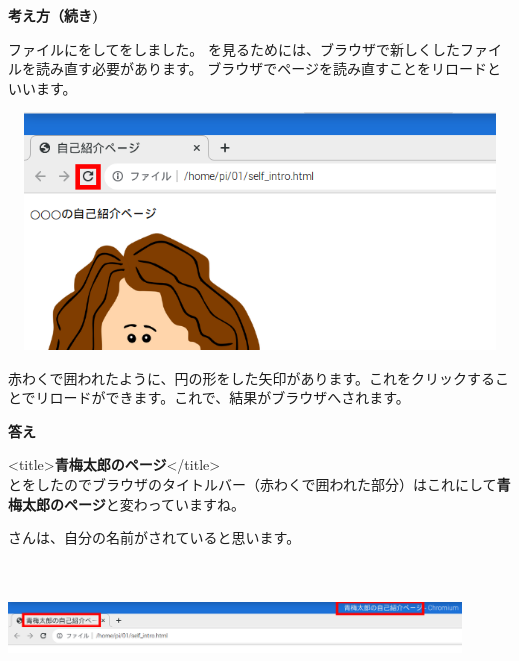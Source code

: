 \documentclass[a4paper,12pt]{jarticle}
\begin{document}
\clearpage
\flushleft
\textbf{考え方（続き)}




ファイルにをしてをしました。
を見るためには、ブラウザで新しくしたファイルを読み直す必要があります。
ブラウザでページを読み直すことをリロードといいます。


\bigskip


\bigskip
\centering
\includegraphics[width=13.665cm,height=6.287cm]{textbook-img149.png}

\flushleft
赤わくで囲われたように、円の形をした矢印があります。これをクリックすることでリロードができます。これで、結果がブラウザへされます。

\vfill
\clearpage
\textbf{答え}


{\textless}title{\textgreater}\textbf{青梅太郎のページ}{\textless}/title{\textgreater}\\
とをしたのでブラウザのタイトルバー（赤わくで囲われた部分）はこれにして\textbf{青梅太郎のページ}と変わっていますね。

さんは、自分の名前がされていると思います。

\centering
\includegraphics[width=12.006cm,height=3.482cm]{textbook-img152.png}
\flushleft
\end{document}
